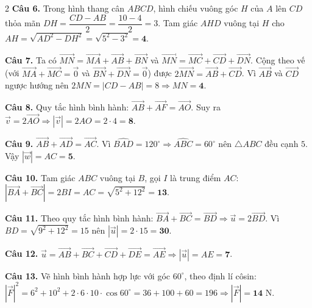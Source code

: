 \documentclass[12pt,a4paper]{article}
\begin{document}
\begin{multicols}{2}
\textbf{Câu 6.} Trong hình thang cân $ABCD$, hình chiếu vuông góc $H$ của $A$ lên $CD$ thỏa mãn $DH = \dfrac{CD - AB}{2} = \dfrac{10 - 4}{2} = 3$. Tam giác $AHD$ vuông tại $H$ cho $AH = \sqrt{AD^2 - DH^2} = \sqrt{5^2 - 3^2} = \mathbf{4}$.\par\vspace{3pt}

\textbf{Câu 7.} Ta có $\vec{MN} = \vec{MA} + \vec{AB} + \vec{BN}$ và $\vec{MN} = \vec{MC} + \vec{CD} + \vec{DN}$. Cộng theo vế (với $\vec{MA} + \vec{MC} = \vec{0}$ và $\vec{BN} + \vec{DN} = \vec{0}$) được $2\vec{MN} = \vec{AB} + \vec{CD}$. Vì $\vec{AB}$ và $\vec{CD}$ ngược hướng nên $2MN = |CD - AB| = 8 \Rightarrow MN = \mathbf{4}$.\par\vspace{3pt}

\textbf{Câu 8.} Quy tắc hình bình hành: $\vec{AB} + \vec{AF} = \vec{AO}$. Suy ra $\vec{v} = 2\vec{AO} \Rightarrow |\vec{v}| = 2AO = 2 \cdot 4 = \mathbf{8}$.\par\vspace{3pt}

\textbf{Câu 9.} $\vec{AB} + \vec{AD} = \vec{AC}$. Vì $\widehat{BAD} = 120^\circ \Rightarrow \widehat{ABC} = 60^\circ$ nên $\triangle ABC$ đều cạnh $5$. Vậy $|\vec{w}| = AC = \mathbf{5}$.\par\vspace{3pt}

\textbf{Câu 10.} Tam giác $ABC$ vuông tại $B$, gọi $I$ là trung điểm $AC$: $|\vec{BA} + \vec{BC}| = 2BI = AC = \sqrt{5^2 + 12^2} = \mathbf{13}$.\par\vspace{3pt}

\textbf{Câu 11.} Theo quy tắc hình bình hành: $\vec{BA} + \vec{BC} = \vec{BD} \Rightarrow \vec{u} = 2\vec{BD}$. Vì $BD = \sqrt{9^2 + 12^2} = 15$ nên $|\vec{u}| = 2 \cdot 15 = \mathbf{30}$.\par\vspace{3pt}

\textbf{Câu 12.} $\vec{u} = \vec{AB} + \vec{BC} + \vec{CD} + \vec{DE} = \vec{AE} \Rightarrow |\vec{u}| = AE = \mathbf{7}$.\par\vspace{3pt}

\textbf{Câu 13.} Vẽ hình bình hành hợp lực với góc $60^\circ$, theo định lí côsin: $|\vec{F}|^2 = 6^2 + 10^2 + 2\cdot 6\cdot 10\cdot \cos 60^\circ = 36 + 100 + 60 = 196 \Rightarrow |\vec{F}| = \mathbf{14}\text{ N}$.\par\vspace{3pt}


\end{multicols}
\end{document}
